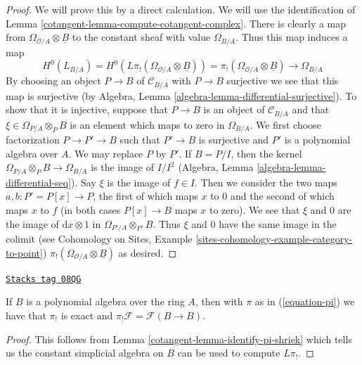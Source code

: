 \begin{proof}

We will prove this by a direct calculation.
We will use the identification of Lemma \ref{cotangent-lemma-compute-cotangent-complex}.
There is clearly a map from $\Omega_{\mathcal{O}/A} \otimes \underline{B}$
to the constant sheaf with value $\Omega_{B/A}$. Thus this map induces
a map
$$
H^0(L_{B/A}) = H^0(L\pi_!(\Omega_{\mathcal{O}/A} \otimes \underline{B}))
= \pi_!(\Omega_{\mathcal{O}/A} \otimes \underline{B}) \to \Omega_{B/A}
$$
By choosing an object $P \to B$ of $\mathcal{C}_{B/A}$ with $P \to B$
surjective we see that this map is surjective (by
Algebra, Lemma \ref{algebra-lemma-differential-surjective}).
To show that it is injective, suppose that $P \to B$ is an object
of $\mathcal{C}_{B/A}$ and that $\xi \in \Omega_{P/A} \otimes_P B$
is an element which maps to zero in $\Omega_{B/A}$.
We first choose factorization $P \to P' \to B$ such that $P' \to B$
is surjective and $P'$ is a polynomial algebra over $A$.
We may replace $P$ by $P'$. If $B = P/I$, then the kernel
$\Omega_{P/A} \otimes_P B \to \Omega_{B/A}$ is the image of
$I/I^2$ (Algebra, Lemma \ref{algebra-lemma-differential-seq}).
Say $\xi$ is the image of $f \in I$.
Then we consider the two maps $a, b : P' = P[x] \to P$, the first of which
maps $x$ to $0$ and the second of which maps $x$ to $f$ (in both
cases $P[x] \to B$ maps $x$ to zero). We see that $\xi$ and $0$
are the image of $\text{d}x \otimes 1$ in $\Omega_{P'/A} \otimes_{P'} B$.
Thus $\xi$ and $0$ have the same image in the colimit (see
Cohomology on Sites, Example \ref{sites-cohomology-example-category-to-point})
$\pi_!(\Omega_{\mathcal{O}/A} \otimes \underline{B})$ as desired.
\end{proof}

\begin{lemma}
\label{cotangent-lemma-pi-lower-shriek-polynomial-algebra}
\href{https://stacks.math.columbia.edu/tag/08QG}{\texttt{Stacks tag 08QG}}

If $B$ is a polynomial algebra over the ring $A$, then
with $\pi$ as in (\ref{equation-pi}) we have that
$\pi_!$ is exact and $\pi_!\mathcal{F} = \mathcal{F}(B \to B)$.
\end{lemma}

\begin{proof}

This follows from Lemma \ref{cotangent-lemma-identify-pi-shriek} which tells us
the constant simplicial algebra on $B$ can be used to compute $L\pi_!$.
\end{proof}

